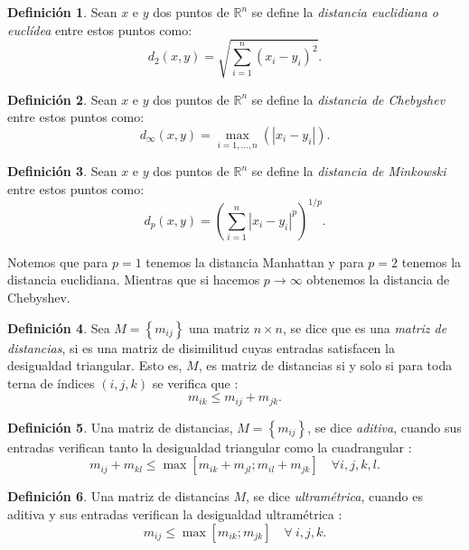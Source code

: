 \documentclass[12pt]{report} %
\theoremstyle{definition}
\newtheorem{definition}{Definición}[section]
\begin{document}
{\begin{definition}
	Sean $x$ e $y$ dos puntos de $\mathbb{R}^n$ se define la \textit{distancia euclidiana o euclídea} \cite{distances} entre estos puntos como:
\begin{equation}
d_2(x,y) = \sqrt{\sum_{i=1}^{n}(x_i-y_i)^2}.
\end{equation}
\end{definition}

\begin{definition}
Sean $x$ e $y$ dos puntos de $\mathbb{R}^n$ se define la \textit{distancia de Chebyshev} \cite{distances} entre estos puntos como:
\begin{equation}
d_\infty(x,y) = \max_{i=1,...,n} (\left| x_i-y_i \right|) .
\end{equation} 
\end{definition}

\begin{definition}
Sean $x$ e $y$ dos puntos de $\mathbb{R}^n$ se define la \textit{distancia de Minkowski} \cite{distances} entre estos puntos como:
\begin{equation} 
d_p(x,y) = \left( \sum_{i=1}^{n}\left| x_i-y_i \right|^p\right)^{1/p}.
\end{equation} 
\end{definition}

Notemos que para $p=1$ tenemos la distancia Manhattan y para $p=2$ tenemos la distancia euclidiana. Mientras que si hacemos $p \rightarrow \infty$ obtenemos la distancia de Chebyshev.

\begin{definition}
	Sea $M = \left\lbrace m_{ij} \right\rbrace $ una matriz $n \times n$, se dice que es una \textit{matriz de distancias}, si es una matriz de disimilitud cuyas entradas satisfacen la desigualdad triangular. Esto es, $M$, es matriz de distancias si y solo si para toda terna de índices $(i,j,k)$ se verifica que \cite{MetricNearness}: 
 $$m_{ik} \leq m_{ij} + m_{jk}.$$
\end{definition}

\begin{definition}
Una matriz de distancias, $M = \left\lbrace m_{ij} \right\rbrace $, se dice \textit{aditiva}, cuando sus entradas verifican tanto la desigualdad triangular como la cuadrangular \cite{Buneman}:
$$m_{ij} + m_{kl} \leq \max[m_{ik}+m_{jl} ; m_{il}+m_{jk}] \quad \forall i,j,k,l. $$
\end{definition}

\begin{definition}
Una matriz de distancias $M$, se dice \textit{ultramétrica}, cuando es aditiva y sus entradas verifican la desigualdad ultramétrica \cite{Hartigan}:
$$ m_{ij} \leq \max[m_{ik};m_{jk}] \quad \forall \ i,j,k.  $$
\end{definition}

}
\end{document}

